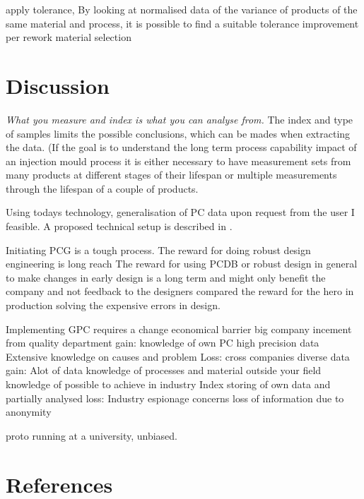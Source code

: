 \documentclass[aip,amsmath, reprint, author-year]{revtex4-1}
\begin{document}
apply tolerance, By looking at normalised data of the variance of products of the same material and process, it is possible to find a suitable tolerance
improvement per rework
material selection


\section{Discussion}

\emph{What you measure and index is what you can analyse from.}
The index and type of samples limits the possible conclusions, which can be mades when extracting the data.  (If the goal is to understand the long term process capability impact of an injection mould process it is either necessary to have measurement sets from many products at different stages of their lifespan or multiple measurements through the lifespan of a couple of products.   

Using todays technology, generalisation of PC data upon request from the user I feasible. A proposed technical setup is described in \cite{OkholmRask}.

Initiating PCG is a tough process. 
The reward for doing robust design engineering is long reach
The reward for using PCDB or robust design in general to make changes in early design is a long term and might only benefit the company and not feedback to the designers compared the reward for the hero in production solving the expensive errors in design.

Implementing GPC requires a change
	economical barrier
		big company
			incement from quality department
			gain: 	knowledge of own PC
					high precision data
					Extensive knowledge on causes and problem
			Loss:
		cross companies
			diverse data
			gain:		Alot of data
					knowledge of processes and material outside your field
					knowledge of possible to achieve in industry
					Index storing of own data and partially analysed
			loss:		Industry espionage concerns
					loss of information due to anonymity

proto running at a university, unbiased.




\section*{References}

\end{document}
